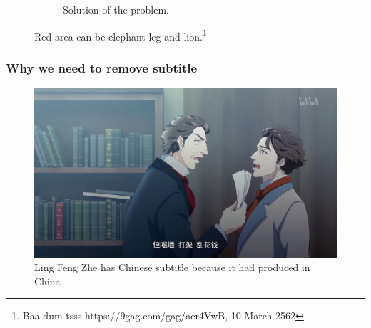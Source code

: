 \documentclass[xcolor=dvipsnames, xetex,serif]{beamer}
\begin{document}
\begin{frame}
\begin{figure}[H]
\begin{subfigure}{0.45\linewidth}
                \caption{Solution of the problem.}
            \end{subfigure}
            \caption{Red area can be elephant leg and lion.\footnote{Baa dum tsss
             https://9gag.com/gag/aer4VwB, 10 March 2562}}
        \end{figure}
    \end{frame}
    \begin{frame}
        \frametitle{Why we need to remove subtitle}
        \begin{figure}
			\includegraphics[width=0.8\linewidth]{images/q_and_a/theleader.png}
			\caption{ Ling Feng Zhe has Chinese subtitle because it had produced in China}
		\end{figure}
    \end{frame}
\end{document}
